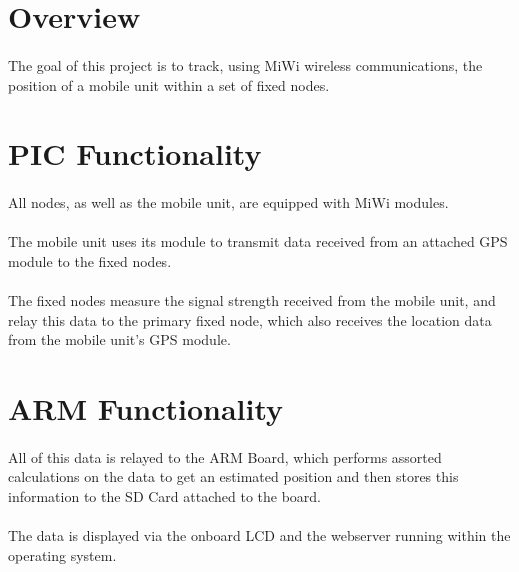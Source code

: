 \documentclass[10pt,letterpaper]{article}
\begin{document}
\section*{Overview}
\paragraph*{}The goal of this project is to track, using MiWi wireless communications, the position of a mobile unit within a set of fixed nodes.

\section*{PIC Functionality}
\paragraph*{}All nodes, as well as the mobile unit, are equipped with MiWi modules. \paragraph*{}The mobile unit uses its module to transmit data received from an attached GPS module to the fixed nodes. 
\paragraph*{}The fixed nodes measure the signal strength received from the mobile unit, and relay this data to the primary fixed node, which also receives the location data from the mobile unit's GPS module. 

\section*{ARM Functionality}
\paragraph*{}All of this data is relayed to the ARM Board, which performs assorted calculations on the data to get an estimated position and then stores this information to the SD Card attached to the board. 
\paragraph*{}The data is displayed via the onboard LCD and the webserver running within the operating system.
\end{document}

